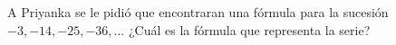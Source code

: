 A Priyanka se le pidió que encontraran una fórmula para la sucesión $-3,-14,-25,-36, \dots$
¿Cu\'al es la f\'ormula que representa la serie? \fillin[$-3-11(n-1)$]
